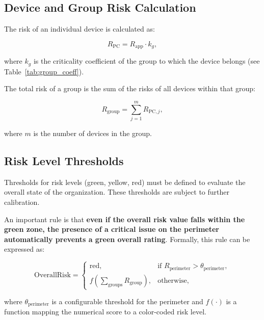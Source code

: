\subsection{Device and Group Risk Calculation}

The risk of an individual device is calculated as:

\begin{equation}
    R_{\text{PC}} = R_{\text{app}} \cdot k_g,
    \label{eq:risk_pc}
\end{equation}

where $k_g$ is the criticality coefficient of the group to which the device belongs (see Table~\ref{tab:group_coeff}).

The total risk of a group is the sum of the risks of all devices within that group:

\begin{equation}
    R_{\text{group}} = \sum_{j=1}^{m} R_{\text{PC},j},
    \label{eq:risk_group}
\end{equation}

where $m$ is the number of devices in the group.

\subsection{Risk Level Thresholds}

Thresholds for risk levels (green, yellow, red) must be defined to evaluate the overall state of the organization.
These thresholds are subject to further calibration.

An important rule is that \textbf{even if the overall risk value falls within the green zone, the presence of a critical issue on the perimeter automatically prevents a green overall rating}.
Formally, this rule can be expressed as:

\begin{equation}
    \text{OverallRisk} =
    \begin{cases}
        \text{red,} & \text{if } R_{\text{perimeter}} > \theta_{\text{perimeter}}, \\
        f\!\left(\sum_{\text{groups}} R_{\text{group}}\right), & \text{otherwise,}
    \end{cases}
    \label{eq:overall_risk}
\end{equation}

where $\theta_{\text{perimeter}}$ is a configurable threshold for the perimeter and $f(\cdot)$ is a function mapping the numerical score to a color-coded risk level.